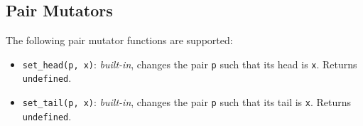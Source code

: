 \subsection*{Pair Mutators}

The following pair mutator functions are supported:

\begin{itemize}
\item \lstinline{set_head(p, x)}: \textit{built-in}, changes the pair \lstinline{p} such that its head is \lstinline{x}.
Returns \lstinline{undefined}.
\item \lstinline{set_tail(p, x)}: \textit{built-in}, changes the pair \lstinline{p} such that its tail is \lstinline{x}.
Returns \lstinline{undefined}.
\end{itemize}

  



